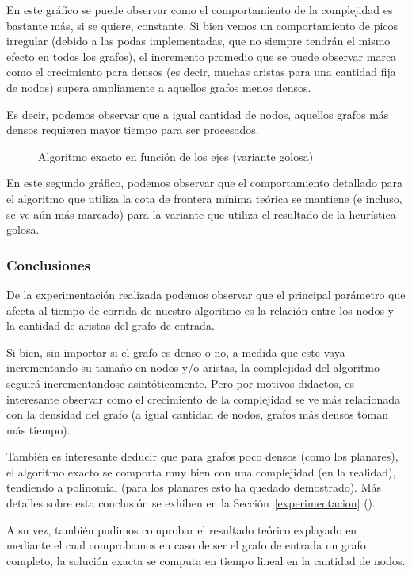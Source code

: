 \par En este gr\'afico se puede observar como el comportamiento de la complejidad
    es bastante m\'as, si se quiere, constante. Si bien vemos un comportamiento
    de picos irregular (debido a las podas implementadas, que no siempre tendr\'an
    el mismo efecto en todos los grafos), el incremento promedio que se puede
    observar marca como el crecimiento para densos (es decir, muchas aristas para
    una cantidad fija de nodos) supera ampliamente a aquellos grafos menos densos.

\par Es decir, podemos observar que a igual cantidad de nodos, aquellos grafos
    m\'as densos requieren mayor tiempo para ser procesados.

\begin{figure}[H]
    \centering
    \fontsize{8}{10}\selectfont
    \resizebox{1.0\textwidth}{!}{}
    \caption{Algoritmo exacto en funci\'on de los ejes (variante golosa)}
\end{figure}

\par En este segundo gr\'afico, podemos observar que el comportamiento detallado
    para el algoritmo que utiliza la cota de frontera m\'inima te\'orica se
    mantiene (e incluso, se ve a\'un m\'as marcado) para la variante que utiliza
    el resultado de la heur\'istica golosa.

\subsubsection{Conclusiones}
\par De la experimentaci\'on realizada podemos observar que el principal par\'ametro
    que afecta al tiempo de corrida de nuestro algoritmo es la relaci\'on entre
    los nodos y la cantidad de aristas del grafo de entrada.

\par Si bien, sin importar si el grafo es denso o no, a medida que este vaya
    incrementando su tama\~no en nodos y/o aristas, la complejidad del algoritmo
    seguir\'a incrementandose asint\'oticamente. Pero por motivos didactos,
    es interesante observar como el crecimiento de la complejidad se ve
    m\'as relacionada con la densidad del grafo (a igual cantidad de nodos, grafos
    m\'as densos toman m\'as tiempo).

\par Tambi\'en es interesante deducir que para grafos poco densos (como los planares),
    el algoritmo exacto se comporta muy bien con una complejidad (en la realidad),
    tendiendo a polinomial (para los planares esto ha quedado demostrado). M\'as
    detalles sobre esta conclusi\'on se exhiben en la Secci\'on~\ref{experimentacion}
    (\emph{}).

\par A su vez, tambi\'en pudimos comprobar el resultado te\'orico explayado
    en~, mediante el cual comprobamos
    en caso de ser el grafo de entrada un grafo completo, la soluci\'on exacta
    se computa en tiempo lineal en la cantidad de nodos.
